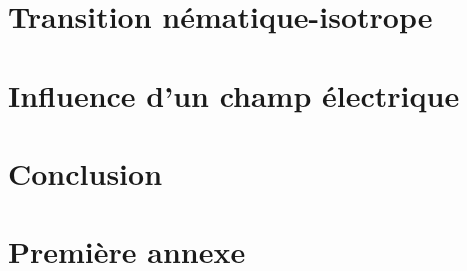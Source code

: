 \documentclass[11pt,a4paper]{article}
\numberwithin{equation}{section}
\begin{document}
\newpage
\section{Transition nématique-isotrope}




\newpage
\section{Influence d'un champ électrique}


\newpage
\section*{Conclusion}


\newpage
\appendix
\section{Première annexe} \label{annexe_fonctionnelles}


\newpage

 
\end{document}
